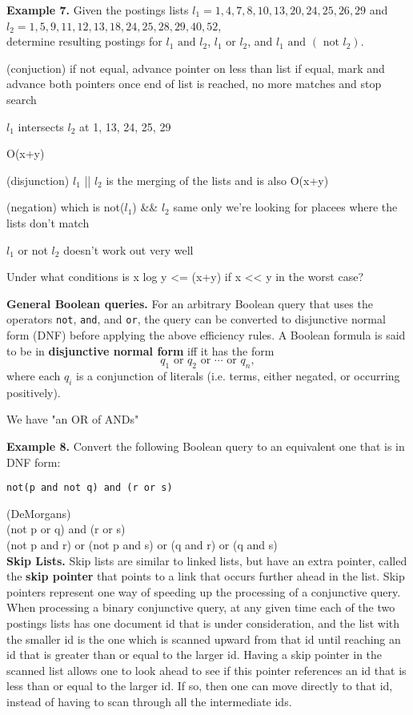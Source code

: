 \documentclass [12pt]{article}
\begin{document}
\vspace{0.5in}
\noindent
\textbf{Example 7.} Given the postings lists $l_{1} = 1,4,7,8,10,13,20,24,25,26,29$ and\\
$l_{2} = 1,5,9,11,12,13,18,24,25,28,29,40,52$,\\
determine resulting postings for 
$l_{1}\mbox{ and } l_{2}$, $l_{1}\mbox{ or } l_{2}$, and 
$l_{1}\mbox{ and } (\mbox{ not }l_{2})$.

(conjuction)
if not equal, advance pointer on less than list
if equal, mark and advance both pointers
once end of list is reached, no more matches and stop search

$l_{1}$ intersects $l_{2}$ at 1, 13, 24, 25, 29

O(x+y)


(disjunction) $l_{1}$ || $l_{2}$ is the merging of the lists and is also O(x+y)

(negation) which is not($l_{1}$) \&\& $l_{2}$ same only we're looking for placees where the lists don't match

$l_{1}$ or not $l_{2}$ doesn't work out very well

Under what conditions is x log y <=  (x+y) if x << y in the worst case?

\newpage
\textbf{General Boolean queries.} For an arbitrary Boolean query that uses the
operators \texttt{not},
\texttt{and}, and \texttt{or}, the query can be converted to disjunctive normal
form (DNF) before applying the above efficiency rules. A Boolean formula is said to be 
in \textbf{disjunctive normal
form} iff it has the form 
\[q_{1}\mbox{ or } q_{2} \mbox{ or }\cdots \mbox{ or } q_{n},\]
where each $q_{i}$ is a conjunction of literals (i.e. terms, either negated, or occurring
positively).

We have "an OR of ANDs"


\textbf{Example 8.} Convert the following Boolean query to an equivalent one that 
is in DNF form:
\begin{verbatim}
not(p and not q) and (r or s)
\end{verbatim} 

(DeMorgans)\\
(not p or q) and (r or s)\\
(not p and r) or (not p and s) or (q and r) or (q and s)\\

\newpage
\textbf{Skip Lists.} Skip lists are similar to linked lists, but have an extra pointer, called the \textbf{skip pointer}
that points to a link that occurs further ahead in the list. Skip pointers represent one way of speeding up the 
processing of a conjunctive query. When processing a binary conjunctive query, at any given time each of the two postings
lists has one document id that is under consideration, and the list with the smaller id is the one which is scanned upward
from that id until reaching an id that is greater than or equal to the larger id. Having a skip pointer in the scanned 
list allows one to look ahead to see if this pointer references an id that is less than or equal to the larger id. If 
so, then one can move directly to that id, instead of having to scan through all the intermediate ids.
\end{document}
